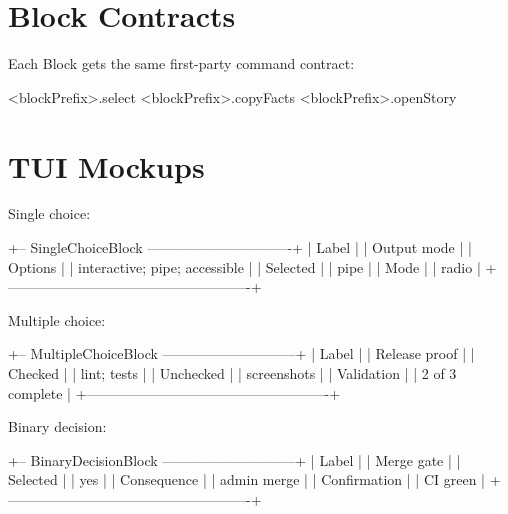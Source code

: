 \section{Block Contracts}\label{record-096-block-contracts}



Each Block gets the same first-party command contract:

\begin{CodeBlock}
<blockPrefix>.select
<blockPrefix>.copyFacts
<blockPrefix>.openStory
\end{CodeBlock}

\section{TUI Mockups}\label{record-096-tui-mockups}

Single choice:

\begin{CodeBlock}
+-- SingleChoiceBlock -------------------------------+
| Label                                              |
|   Output mode                                      |
| Options                                            |
|   interactive; pipe; accessible                    |
| Selected                                           |
|   pipe                                             |
| Mode                                               |
|   radio                                            |
+----------------------------------------------------+
\end{CodeBlock}

Multiple choice:

\begin{CodeBlock}
+-- MultipleChoiceBlock -----------------------------+
| Label                                              |
|   Release proof                                    |
| Checked                                            |
|   lint; tests                                      |
| Unchecked                                          |
|   screenshots                                      |
| Validation                                         |
|   2 of 3 complete                                  |
+----------------------------------------------------+
\end{CodeBlock}

Binary decision:

\begin{CodeBlock}
+-- BinaryDecisionBlock -----------------------------+
| Label                                              |
|   Merge gate                                       |
| Selected                                           |
|   yes                                              |
| Consequence                                        |
|   admin merge                                      |
| Confirmation                                       |
|   CI green                                         |
+----------------------------------------------------+
\end{CodeBlock}

